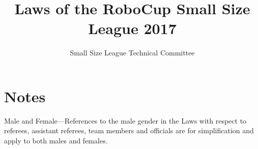 \documentclass[12pt]{article}
\newif\ifdiff
\newcommand{\added}[1]{\textcolor{green}{#1}}
\newcommand{\removed}[1]{\textcolor{red}{#1}}
\newcommand{\added}[1]{#1}
\newcommand{\removed}[1]{}
\begin{document}
\setcounter{page}{1}

\title{Laws of the RoboCup Small Size League 2017}
\author{Small Size League Technical Committee}

\maketitle

\vfill

\tableofcontents

\section*{Notes}
Male and Female---References to the male gender in the Laws with respect to referees, assistant referees, team members and officials are for simplification and apply to both males and females.

\ifdiff
\added{Text added from the previous year is shown in green.}
\removed{Text removed from the previous year is shown in red.}
\fi

\thispagestyle{fancy}

\clearpage

\cfoot{\thepage}
\setcounter{page}{1}



















\appendix



\end{document}

